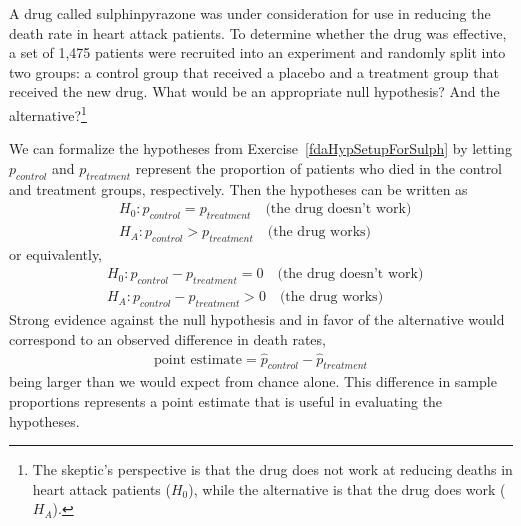 \begin{exercise} \label{fdaHypSetupForSulph}
A drug called sulphinpyrazone was under consideration for use in reducing the death rate in heart attack patients. To determine whether the drug was effective, a set of 1,475 patients were recruited into an experiment and randomly split into two groups: a control group that received a placebo and a treatment group that received the new drug. What would be an appropriate null hypothesis? And the alternative?\footnote{The skeptic's perspective is that the drug does not work at reducing deaths in heart attack patients ($H_0$), while the alternative is that the drug does work ($H_A$).}
\end{exercise}

We can formalize the hypotheses from Exercise~\ref{fdaHypSetupForSulph} by letting $p_{control}$ and $p_{treatment}$ represent the proportion of patients who died in the control and treatment groups, respectively. Then the hypotheses can be written as
\begin{eqnarray*}
&&H_0: p_{control} = p_{treatment} \quad\text{(the drug doesn't work)} \quad \\
&&H_A: p_{control} > p_{treatment} \quad\text{(the drug works)}
\end{eqnarray*}
or equivalently,
\begin{eqnarray*}
&&H_0: p_{control} - p_{treatment} = 0 \quad\text{(the drug doesn't work)} \quad \\
&&H_A: p_{control} - p_{treatment} > 0 \quad\text{(the drug works)}
\end{eqnarray*}
Strong evidence against the null hypothesis and in favor of the alternative would correspond to an observed difference in death rates,
\begin{eqnarray*}
\text{point estimate} = \hat{p}_{control} - \hat{p}_{treatment}
\end{eqnarray*}
being larger than we would expect from chance alone. This difference in sample proportions represents a point estimate that is useful in evaluating the hypotheses. 

